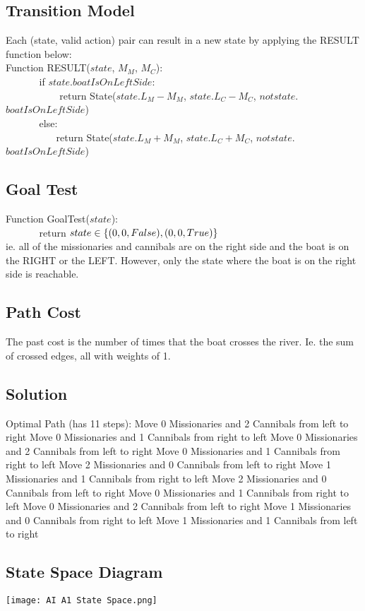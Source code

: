 \documentclass{article}
\begin{document}
    
\subsection{Transition Model}
Each (state, valid action) pair can result in a new state by applying the RESULT function below:\\

\verb|| Function RESULT($state$, $M_M$, $M_C$):\\
\verb|      | if $state$.$boatIsOnLeftSide$:\\
\verb|          | return State($state$.$L_M - M_M$, $state$.$L_C - M_C$, $not state$.$boatIsOnLeftSide$)\\
\verb|      | else:\\
\verb|          |return State($state$.$L_M + M_M$, $state$.$L_C + M_C$, $not state$.$boatIsOnLeftSide$)\\

\subsection{Goal Test}
\verb|| Function GoalTest($state$):\\
\verb|      | return $state \in \{ (0,0, False), (0,0, True)\}\\ $\\
    ie. all of the missionaries and cannibals are on the right side and the boat is on the RIGHT or the LEFT. However, only the state where the boat is on the right side is reachable.
    
\subsection{Path Cost}
    The past cost is the number of times that the boat crosses the river. Ie. the sum of crossed edges, all with weights of 1.
    
    
\subsection{Solution}
Optimal Path (has 11 steps):
Move  0 Missionaries and  2 Cannibals from  left to right
Move  0 Missionaries and  1 Cannibals from  right to left
Move  0 Missionaries and  2 Cannibals from  left to right
Move  0 Missionaries and  1 Cannibals from  right to left
Move  2 Missionaries and  0 Cannibals from  left to right
Move  1 Missionaries and  1 Cannibals from  right to left
Move  2 Missionaries and  0 Cannibals from  left to right
Move  0 Missionaries and  1 Cannibals from  right to left
Move  0 Missionaries and  2 Cannibals from  left to right
Move  1 Missionaries and  0 Cannibals from  right to left
Move  1 Missionaries and  1 Cannibals from  left to right

\subsection{State Space Diagram}
\texttt{[image: AI A1 State Space.png]}
\end{document}
